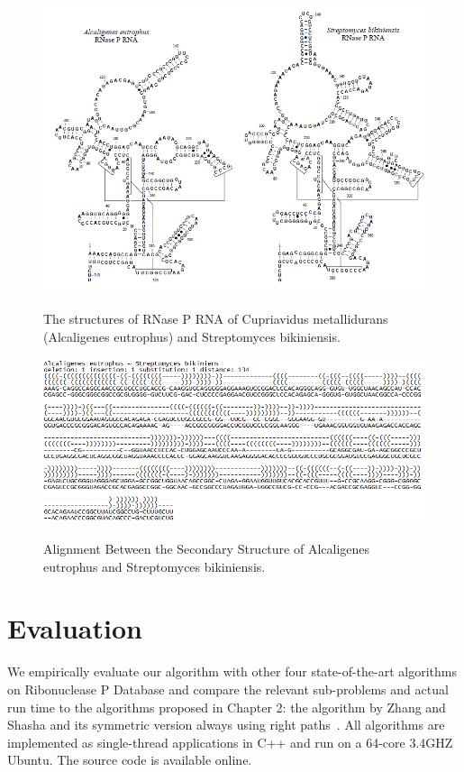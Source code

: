 \begin{figure}
		\centering
		\includegraphics[width=13cm,clip]{Figures/RNAGraphExample}
		\label{The structures of RNase P RNA of Cupriavidus metallidurans (Alcaligenes eutrophus) and Streptomyces bikiniensis.} 
		\caption{The structures of RNase P RNA of Cupriavidus metallidurans (Alcaligenes
eutrophus) and Streptomyces bikiniensis.}
\end{figure}

\begin{figure}
		\centering
		\includegraphics[width=17cm,clip]{Figures/AlignmentResult}
		\label{Alignment Between Two RNAs.} 
		\caption{Alignment Between the Secondary Structure of Alcaligenes eutrophus and Streptomyces bikiniensis.}
\end{figure}

\section{Evaluation}
We empirically evaluate our algorithm with other four state-of-the-art algorithms on Ribonuclease P Database and compare the relevant sub-problems and actual run time to the algorithms proposed in Chapter 2: the algorithm by Zhang and Shasha and its symmetric version always using right paths~\cite{zhang1989simple}. All algorithms are implemented as single-thread applications in C++ and run on a 64-core 3.4GHZ Ubuntu. The source code is available online.

